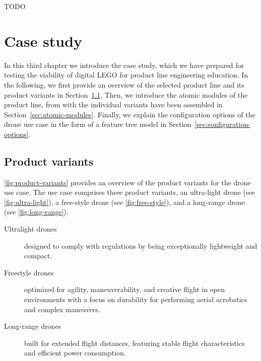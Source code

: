 \documentclass[sigconf,review]{acmart}
\begin{document}
TODO

\section{Case study}
\label{sec:case-study}

In this third chapter we introduce the case study, which we have prepared for testing the viability of digital LEGO for product line engineering education.
In the following, we first provide an overview of the selected product line and its product variants in Section~\ref{sec:product-variants}.
Then, we introduce the atomic modules of the product line, from with the individual variants have been assembled in Section~\ref{sec:atomic-modules}.
Finally, we explain the configuration options of the drone use case in the form of a feature tree model in Section~\ref{sec:configuration-options}.

\subsection{Product variants}
\label{sec:product-variants}

\cref{fig:product-variants} provides an overview of the product variants for the drone use case.
The use case comprises three product variants, an ultra-light drone (see \cref{fig:ultra-light}), a free-style drone (see \cref{fig:free-style}), and a long-range drone (see \cref{fig:long-range}).

\begin{description}
    \item[Ultralight drones] designed to comply with regulations by being exceptionally lightweight and compact.
    \item[Freestyle drones] optimized for agility, maneuverability, and creative flight in open environments with a focus on durability for performing aerial acrobatics and complex maneuvers.
    \item[Long-range drones] built for extended flight distances, featuring stable flight characteristics and efficient power consumption.
\end{description}
\end{document}
